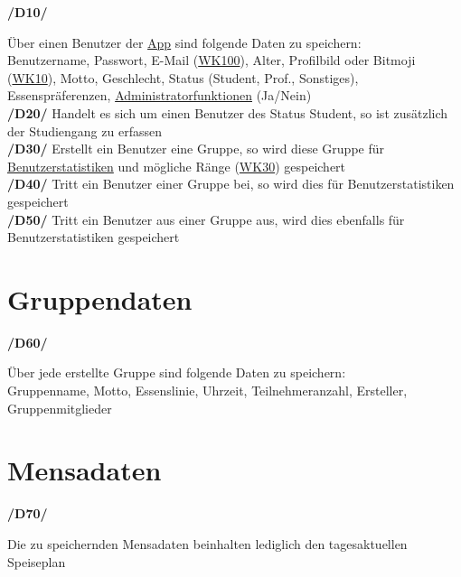 \documentclass[a4paper]{scrreprt}
\begin{document}
\begin{addmargin}[25pt]{0pt}
\hypertarget{d10}{\textbf{/D10/}} Über einen Benutzer der \hyperlink{label6}{App} sind folgende Daten zu speichern:\\
Benutzername, Passwort, E-Mail (\hyperlink{wk100}{WK100}), Alter, Profilbild oder Bitmoji (\hyperlink{wk10}{WK10}), Motto, Geschlecht, Status (Student, Prof., Sonstiges), Essenspräferenzen, \hyperlink{label8}{Administratorfunktionen} (Ja/Nein)\\
\hypertarget{d20}{\textbf{/D20/}} Handelt es sich um einen Benutzer des Status Student, so ist zusätzlich der Studiengang zu erfassen\\
\hypertarget{d30}{\textbf{/D30/}} Erstellt ein Benutzer eine Gruppe, so wird diese Gruppe für \hyperlink{label9}{Benutzerstatistiken} und mögliche Ränge (\hyperlink{wk30}{WK30}) gespeichert\\
\hypertarget{d40}{\textbf{/D40/}} Tritt ein Benutzer einer Gruppe bei, so wird dies für Benutzerstatistiken gespeichert\\
\hypertarget{d50}{\textbf{/D50/}} Tritt ein Benutzer aus einer Gruppe aus, wird dies ebenfalls für Benutzerstatistiken gespeichert\\


\end{addmargin}

\section{Gruppendaten}

\begin{addmargin}[25pt]{0pt}
\hypertarget{d60}{\textbf{/D60/}} Über jede erstellte Gruppe sind folgende Daten zu speichern:\\
Gruppenname, Motto, Essenslinie, Uhrzeit, Teilnehmeranzahl, Ersteller, Gruppenmitglieder\\
\end{addmargin}

\section{Mensadaten}

\begin{addmargin}[25pt]{0pt}
\hypertarget{d70}{\textbf{/D70/}} Die zu speichernden Mensadaten beinhalten lediglich den tagesaktuellen Speiseplan\\
\end{addmargin}
\end{document}

